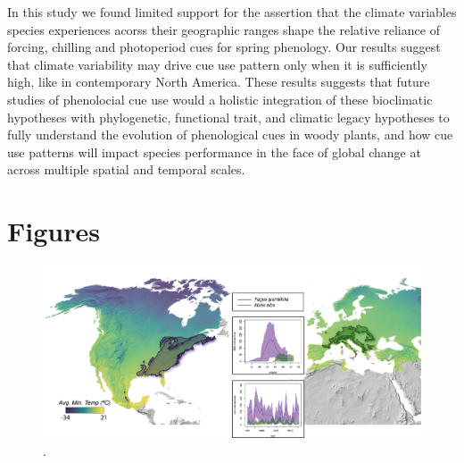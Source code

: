 \documentclass[12pt]{article}\usepackage[]{graphicx}\usepackage[]{color}
\begin{document}
In this study we found limited support for the assertion that the climate variables species experiences acorss their geographic ranges shape the relative reliance of forcing, chilling and photoperiod cues for spring phenology. Our results suggest that climate variability may drive cue use pattern only when it is sufficiently high, like in contemporary North America. These results suggests that future studies of phenolocial cue use would a holistic integration of these bioclimatic hypotheses with phylogenetic, functional trait, and climatic legacy hypotheses to fully understand the evolution of phenological cues in woody plants, and how cue use patterns will impact species performance in the face of global change at across multiple spatial and temporal scales.










\section*{Figures}

\begin{figure}[h!]
    \centering
 \includegraphics[width=\textwidth]{..//..//analyses/ranges/figures/concept figure draft2.png} 
    \caption{. }
    \label{fig:concept}
\end{figure}
\end{document}
